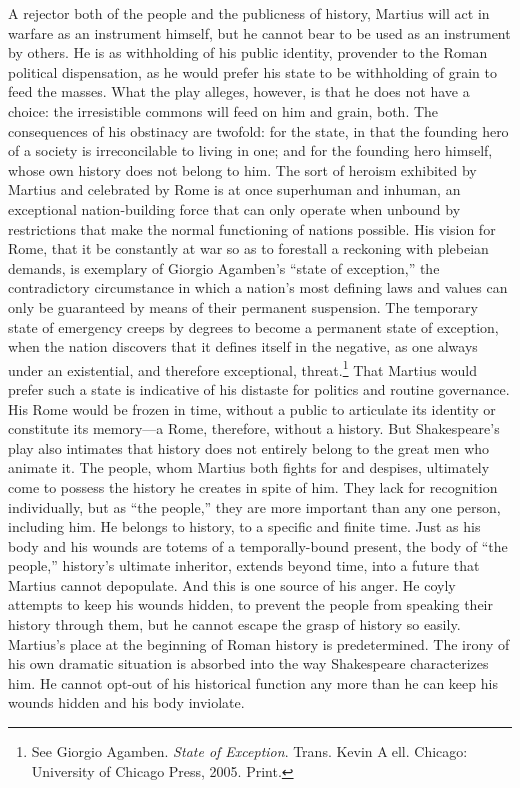 A rejector both of the people and the publicness of history, Martius will act in warfare as an instrument himself, but he cannot bear to be used as an instrument by others.
He is as withholding of his public identity, provender to the Roman political dispensation, as he would prefer his state to be withholding of grain to feed the masses.
What the play alleges, however, is that he does not have a choice: the irresistible commons will feed on him and grain, both.
The consequences of his obstinacy are twofold: for the state, in that the founding hero of a society is irreconcilable to living in one; and for the founding hero himself, whose own history does not belong to him.
The sort of heroism exhibited by Martius and celebrated by Rome is at once superhuman and inhuman, an exceptional nation-building force that can only operate when unbound by restrictions that make the normal functioning of nations possible.
His vision for Rome, that it be constantly at war so as to forestall a reckoning with plebeian demands, is exemplary of Giorgio Agamben's ``state of exception,'' the contradictory circumstance in which a nation's most defining laws and values can only be guaranteed by means of their permanent suspension.
The temporary state of emergency creeps by degrees to become a permanent state of exception, when the nation discovers that it defines itself in the negative, as one always under an existential, and therefore exceptional, threat.\footnote{See Giorgio Agamben. \emph{State of Exception}. Trans. Kevin Aell. Chicago: University of Chicago Press, 2005. Print.\nocite{agamben_2005}}
That Martius would prefer such a state is indicative of his distaste for politics and routine governance.
His Rome would be frozen in time, without a public to articulate its identity or constitute its memory---a Rome, therefore, without a history.
But Shakespeare's play also intimates that history does not entirely belong to the great men who animate it.
The people, whom Martius both fights for and despises, ultimately come to possess the history he creates in spite of him.
They lack for recognition individually, but as ``the people,'' they are more important than any one person, including him.
He belongs to history, to a specific and finite time.
Just as his body and his wounds are totems of a temporally-bound present, the body of ``the people,'' history's ultimate inheritor, extends beyond time, into a future that Martius cannot depopulate.
And this is one source of his anger.
He coyly attempts to keep his wounds hidden, to prevent the people from speaking their history through them, but he cannot escape the grasp of history so easily.
Martius's place at the beginning of Roman history is predetermined.
The irony of his own dramatic situation is absorbed into the way Shakespeare characterizes him.
He cannot opt-out of his historical function any more than he can keep his wounds hidden and his body inviolate.

